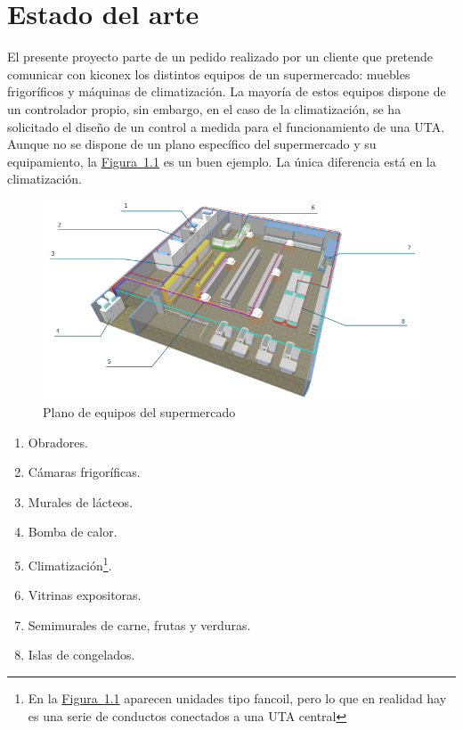 
\cleardoublepage
\chapter{Estado del arte}

\label{chap:estadoArte} %

El presente proyecto parte de un pedido realizado por un cliente que pretende comunicar con kiconex los distintos equipos de un supermercado: muebles frigoríficos y máquinas de climatización. La mayoría de estos equipos dispone de un controlador propio, sin embargo, en el caso de la climatización, se ha solicitado el diseño de un control a medida para el funcionamiento de una UTA. Aunque no se dispone de un plano específico del supermercado y su equipamiento, la \hyperref[figura:planoSupermercado]{Figura~\ref{figura:planoSupermercado}} es un buen ejemplo. La única diferencia está en la climatización.

\hspace{1em}

\begin{figure}[h]
  \centering
  \includegraphics[width=16cm, keepaspectratio]{img/planoSupermercado}
  \caption{Plano de equipos del supermercado}
  \label{figura:planoSupermercado}
\end{figure}

\begin{enumerate}
  \item Obradores.
  \item Cámaras frigoríficas.
  \item Murales de lácteos.
  \item Bomba de calor.
  \item Climatización\footnote[1]{En la \hyperref[figura:planoSupermercado]{Figura~\ref{figura:planoSupermercado}} aparecen unidades tipo fancoil, pero lo que en realidad hay es una serie de conductos conectados a una UTA central}.
  \item Vitrinas expositoras.
  \item Semimurales de carne, frutas y verduras.
  \item Islas de congelados.
\end{enumerate}

